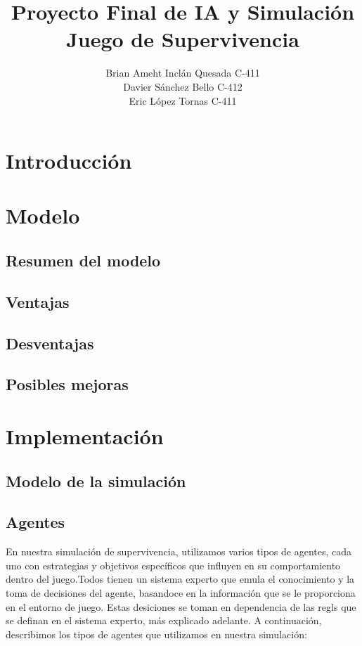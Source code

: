 \documentclass[11pt]{article}
\author{Brian Ameht Inclán Quesada C-411\\ Davier Sánchez Bello C-412\\ Eric López Tornas C-411}
\title{Proyecto Final de IA y Simulación \\ Juego de Supervivencia}
\date{}
\begin{document}
\maketitle
\newpage

\tableofcontents
\newpage

\section{Introducción}

\section{Modelo}
\subsection{Resumen del modelo}
\subsection{Ventajas}
\subsection{Desventajas}
\subsection{Posibles mejoras}


\section{Implementación}
\subsection{Modelo de la simulación}
\subsection{Agentes}
En nuestra simulación de supervivencia, utilizamos varios tipos de agentes, cada uno con estrategias y objetivos específicos que influyen en su comportamiento dentro del juego.Todos tienen un sistema experto que emula el conocimiento y la toma de decisiones del agente,
basandoce en la información que se le proporciona en el entorno de juego. Estas desiciones se toman en dependencia de las regls que se definan en el sistema experto, más explicado adelante. A continuación, describimos los tipos de agentes que utilizamos en nuestra simulación:
\end{document}
